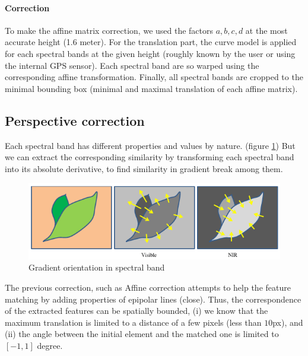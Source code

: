 \documentclass[]{elsarticle}
\begin{document}
	\paragraph{Correction}
	
	To make the affine matrix correction, we used the factors $a,b,c,d$ at the most accurate height (1.6 meter).
	For the translation part, the curve model is applied for each spectral bands at the given height (roughly known by the user or using the internal GPS sensor).
	Each spectral band are so warped using the corresponding affine transformation.
	Finally, all spectral bands are cropped to the minimal bounding box (minimal and maximal translation of each affine matrix).
	
	\subsection{Perspective correction}
	
	
	Each spectral band has different properties and values by nature. (figure \ref{fig:vegetable-gradient})
	But we can extract the corresponding similarity by transforming each spectral band into its absolute derivative,
	to find similarity in gradient break among them.
	
	\begin{figure}[!htb]
		\centering
		\includegraphics[width=\linewidth]{../figures/contrast-inversion.png}
		\caption{Gradient orientation in spectral band \cite{rabatel:hal-01684135}}
		\label{fig:vegetable-gradient}
	\end{figure}
	
	\par The previous correction, such as Affine correction attempts to help the feature matching by adding properties of epipolar lines (close).
	Thus, the correspondence of the extracted features can be spatially bounded,
	(i) we know that the maximum translation is limited to a distance of a few pixels (less than $10$px),
	and (ii) the angle between the initial element and the matched one is limited to $[-1,1]$ degree.
	
\end{document}
